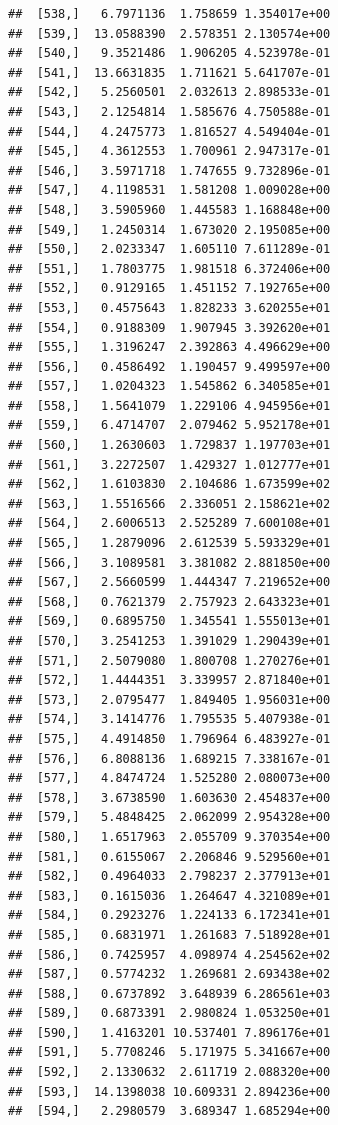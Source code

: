 \documentclass[article]{jss}\usepackage[]{graphicx}\usepackage[]{xcolor}
\makeatletter
\newenvironment{kframe}{%
 \def\at@end@of@kframe{}%
 \ifinner\ifhmode%
  \def\at@end@of@kframe{\end{minipage}}%
  \begin{minipage}{\columnwidth}%
 \fi\fi%
 \def\FrameCommand##1{\hskip\@totalleftmargin \hskip-\fboxsep
 \colorbox{shadecolor}{##1}\hskip-\fboxsep
     \hskip-\linewidth \hskip-\@totalleftmargin \hskip\columnwidth}%
 \MakeFramed {\advance\hsize-\width
   \@totalleftmargin\z@ \linewidth\hsize
   \@setminipage}}%
 {\par\unskip\endMakeFramed%
 \at@end@of@kframe}
\newenvironment{knitrout}{}{} %
\makeatother
\begin{document}
\begin{knitrout}
\begin{kframe}
\begin{verbatim}
##  [538,]   6.7971136  1.758659 1.354017e+00
##  [539,]  13.0588390  2.578351 2.130574e+00
##  [540,]   9.3521486  1.906205 4.523978e-01
##  [541,]  13.6631835  1.711621 5.641707e-01
##  [542,]   5.2560501  2.032613 2.898533e-01
##  [543,]   2.1254814  1.585676 4.750588e-01
##  [544,]   4.2475773  1.816527 4.549404e-01
##  [545,]   4.3612553  1.700961 2.947317e-01
##  [546,]   3.5971718  1.747655 9.732896e-01
##  [547,]   4.1198531  1.581208 1.009028e+00
##  [548,]   3.5905960  1.445583 1.168848e+00
##  [549,]   1.2450314  1.673020 2.195085e+00
##  [550,]   2.0233347  1.605110 7.611289e-01
##  [551,]   1.7803775  1.981518 6.372406e+00
##  [552,]   0.9129165  1.451152 7.192765e+00
##  [553,]   0.4575643  1.828233 3.620255e+01
##  [554,]   0.9188309  1.907945 3.392620e+01
##  [555,]   1.3196247  2.392863 4.496629e+00
##  [556,]   0.4586492  1.190457 9.499597e+00
##  [557,]   1.0204323  1.545862 6.340585e+01
##  [558,]   1.5641079  1.229106 4.945956e+01
##  [559,]   6.4714707  2.079462 5.952178e+01
##  [560,]   1.2630603  1.729837 1.197703e+01
##  [561,]   3.2272507  1.429327 1.012777e+01
##  [562,]   1.6103830  2.104686 1.673599e+02
##  [563,]   1.5516566  2.336051 2.158621e+02
##  [564,]   2.6006513  2.525289 7.600108e+01
##  [565,]   1.2879096  2.612539 5.593329e+01
##  [566,]   3.1089581  3.381082 2.881850e+00
##  [567,]   2.5660599  1.444347 7.219652e+00
##  [568,]   0.7621379  2.757923 2.643323e+01
##  [569,]   0.6895750  1.345541 1.555013e+01
##  [570,]   3.2541253  1.391029 1.290439e+01
##  [571,]   2.5079080  1.800708 1.270276e+01
##  [572,]   1.4444351  3.339957 2.871840e+01
##  [573,]   2.0795477  1.849405 1.956031e+00
##  [574,]   3.1414776  1.795535 5.407938e-01
##  [575,]   4.4914850  1.796964 6.483927e-01
##  [576,]   6.8088136  1.689215 7.338167e-01
##  [577,]   4.8474724  1.525280 2.080073e+00
##  [578,]   3.6738590  1.603630 2.454837e+00
##  [579,]   5.4848425  2.062099 2.954328e+00
##  [580,]   1.6517963  2.055709 9.370354e+00
##  [581,]   0.6155067  2.206846 9.529560e+01
##  [582,]   0.4964033  2.798237 2.377913e+01
##  [583,]   0.1615036  1.264647 4.321089e+01
##  [584,]   0.2923276  1.224133 6.172341e+01
##  [585,]   0.6831971  1.261683 7.518928e+01
##  [586,]   0.7425957  4.098974 4.254562e+02
##  [587,]   0.5774232  1.269681 2.693438e+02
##  [588,]   0.6737892  3.648939 6.286561e+03
##  [589,]   0.6873391  2.980824 1.053250e+01
##  [590,]   1.4163201 10.537401 7.896176e+01
##  [591,]   5.7708246  5.171975 5.341667e+00
##  [592,]   2.1330632  2.611719 2.088320e+00
##  [593,]  14.1398038 10.609331 2.894236e+00
##  [594,]   2.2980579  3.689347 1.685294e+00

\end{verbatim}
\end{kframe}
\end{knitrout}
\end{document}

